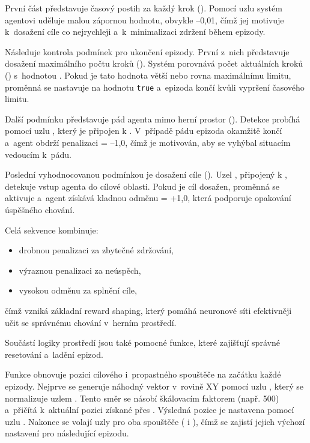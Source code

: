 První část představuje časový postih za každý krok (). Pomocí uzlu  systém agentovi uděluje malou zápornou hodnotu, obvykle –0{,}01, čímž jej motivuje k~dosažení cíle co nejrychleji a~k~minimalizaci zdržení během epizody.

Následuje kontrola podmínek pro ukončení epizody. První z~nich představuje dosažení maximálního počtu kroků (). Systém porovnává počet aktuálních kroků () s~hodnotou . Pokud je tato hodnota větší nebo rovna maximálnímu limitu, proměnná  se nastavuje na hodnotu \texttt{true} a~epizoda končí kvůli vypršení časového limitu.

Další podmínku představuje pád agenta mimo herní prostor (). Detekce probíhá pomocí uzlu , který je připojen k . V~případě pádu epizoda okamžitě končí a~agent obdrží penalizaci  = –1{,}0, čímž je motivován, aby se vyhýbal situacím vedoucím k~pádu.

Poslední vyhodnocovanou podmínkou je dosažení cíle (). Uzel , připojený k , detekuje vstup agenta do cílové oblasti. Pokud je cíl dosažen, proměnná  se aktivuje a~agent získává kladnou odměnu  = +1{,}0, která podporuje opakování úspěšného chování.

Celá sekvence kombinuje:

\begin{itemize}
\item drobnou penalizaci za zbytečné zdržování,
\item výraznou penalizaci za neúspěch,
\item vysokou odměnu za splnění cíle,
\end{itemize}

čímž vzniká základní reward shaping, který pomáhá neuronové síti efektivněji učit se správnému chování v~herním prostředí.

\newpage

Součástí logiky prostředí jsou také pomocné funkce, které zajišťují správné resetování a~ladění epizod.

Funkce  obnovuje pozici cílového i~propastného spouštěče na začátku každé epizody. Nejprve se generuje náhodný vektor v~rovině XY pomocí uzlu , který se normalizuje uzlem . Tento směr se násobí škálovacím faktorem (např. 500) a~přičítá k~aktuální pozici získané přes . Výsledná pozice je nastavena pomocí uzlu . Nakonec se volají uzly  pro oba spouštěče ( i ), čímž se zajistí jejich výchozí nastavení pro následující epizodu.


